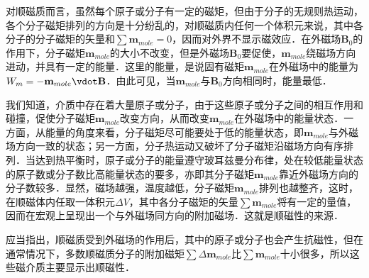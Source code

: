 
对顺磁质而言，虽然每个原子或分子有一定的磁矩，但由于分子的无规则热运动，各个分子磁矩排列的方向是十分纷乱的，对顺磁质内任何一个体积元来说，其中各分子的分子磁矩的矢量和$\sum \mathbf{m}_{mole}=0$，因而对外界不显示磁效应．在外磁场$\mathbf B_0$的作用下，分子磁矩$\mathbf{m}_{mole}$的大小不改变，但是外磁场$\mathbf B_0$要促使，$\mathbf{m}_{mole}$绕磁场方向进动，并具有一定的能量．这里的能量，是说固有磁矩$\mathbf m_{mole}$在外磁场中的能量为$W_m=-\mathbf m_{mole} \vdot \mathbf B$．由此可见，当$\mathbf m_{mole}$与$\mathbf B_0$方向相同时，能量最低．

我们知道，介质中存在着大量原子或分子，由于这些原子或分子之间的相互作用和碰撞，促使分子磁矩$\mathbf m_{mole}$改变方向，从而改变$\mathbf m_{mole}$在外磁场中的能量状态．一方面，从能量的角度来看，分子磁矩尽可能要处于低的能量状态，即$\mathbf m_{mole}$与外磁场方向一致的状态；另一方面，分子热运动又破坏了分子磁矩沿磁场方向有序排列．当达到热平衡时，原子或分子的能量遵守玻耳兹曼分布律，处在较低能量状态的原子数或分子数比高能量状态的要多，亦即其分子磁矩$\mathbf m_{mole}$靠近外磁场方向的分子数较多．显然，磁场越强，温度越低，分子磁矩$\mathbf m_{mole}$排列也越整齐，这时，在顺磁体内任取一体积元$\Delta V$，其中各分子磁矩的矢量$\sum \mathbf m_{mole}$将有一定的量值，因而在宏观上呈现出一个与外磁场同方向的附加磁场．这就是顺磁性的来源．

应当指出，顺磁质受到外磁场的作用后，其中的原子或分子也会产生抗磁性，但在通常情况下，多数顺磁质分子的附加磁矩$\sum \Delta\mathbf m_{mole}$比$\sum \mathbf m_{mole}$十小很多，所以这些磁介质主要显示出顺磁性．